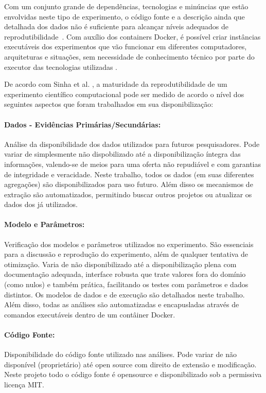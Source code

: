 \documentclass[sigconf]{acmart}
\begin{document}
Com um conjunto grande de dependências, tecnologias e minúncias que estão envolvidas neste tipo de experimento, o código fonte e a descrição ainda que detalhada dos dados não é suficiente para alcançar níveis adequados de reprodutibilidade~\cite{ince2012}. Com auxílio dos containers Docker, é possível criar instâncias executáveis dos experimentos que vão funcionar em diferentes computadores, arquiteturas e situações, sem necessidade de conhecimento técnico por parte do executor das tecnologias utilizadas \cite{boettiger2015}.

De acordo com Sinha et al. \cite{sinha2016}, a maturidade da reprodutibilidade de um experimento científico computacional pode ser medido de acordo o nível dos seguintes aspectos que foram trabalhados em sua disponibilização:

\paragraph{Dados - Evidências Primárias/Secundárias:} Análise da disponibilidade dos dados utilizados para futuros pesquisadores. Pode variar de simplesmente não dispobilizado até a disponibilização íntegra das informações, valendo-se de meios para uma oferta não repudiável e com garantias de integridade e veracidade. Neste trabalho, todos os dados (em suas diferentes agregações) são disponibilizados para uso futuro. Além disso os mecanismos de extração são automatizados, permitindo buscar outros projetos ou atualizar os dados dos já utilizados.

\paragraph{Modelo e Parâmetros:} Verificação dos modelos e parâmetros utilizados no experimento. São essenciais para a discussão e reprodução do experimento, além de qualquer tentativa de otimização. Varia de não disponibilizado até a disponibilização plena com documentação adequada, interface robusta que trate valores fora do domínio (como nulos) e também prática, facilitando os testes com parâmetros e dados distintos. Os modelos de dados e de execução são detalhados neste trabalho. Além disso, todas as análises são automatizadas e encapusladas através de comandos executáveis dentro de um contâiner Docker.

\paragraph{Código Fonte:} Disponibilidade do código fonte utilizado nas análises. Pode variar de não disponível (proprietário) até open source com direito de extensão e modificação. Neste projeto todo o código fonte é opensource e disponibilizado sob a permissiva licença MIT.
\end{document}
